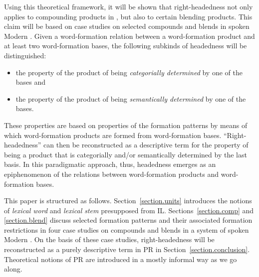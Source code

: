 \documentclass[output=paper
  ,nobabel
  ,draftmode
  ,colorlinks, citecolor=brown
]{langscibook}
\begin{document}
Using this theoretical framework, it will be shown that right-headedness not
only applies to compounding products in , but also to certain blending
products. This claim will be based on case studies on selected compounds and
blends in spoken Modern . Given a word-formation relation between a
word-formation product and at least two word-formation bases, the following
subkinds of headedness will be distinguished: \begin{itemize}
\item{} the property of the product of being \emph{categorially determined}
by one of the bases and
\item{} the property of the product of being \emph{semantically determined}
by one of the bases.
\end{itemize} These properties are based on properties of the formation patterns by
means of which word-formation products are formed from word-formation bases.
``Right-headedness'' can then be reconstructed as a descriptive
term for the property of being a product that is categorially and/or
semantically determined by the last basis. In this paradigmatic approach, thus,
headedness emerges as an epiphenomenon of the relations between word-formation
products and word-formation bases.

This paper is structured as follows. Section \ref{section.units} introduces the notions of \emph{lexical
word} and \emph{lexical stem} presupposed from IL. Sections \ref{section.comp} and \ref{section.blend} discuss selected formation patterns and their
associated formation restrictions in four case studies on compounds and blends
in a system of spoken Modern . On the basis of these case studies,
right-headedness will be reconstructed as a purely descriptive term in PR in
Section \ref{section.conclusion}. Theoretical notions
of PR are introduced in a mostly informal way as we go along.
\end{document}
